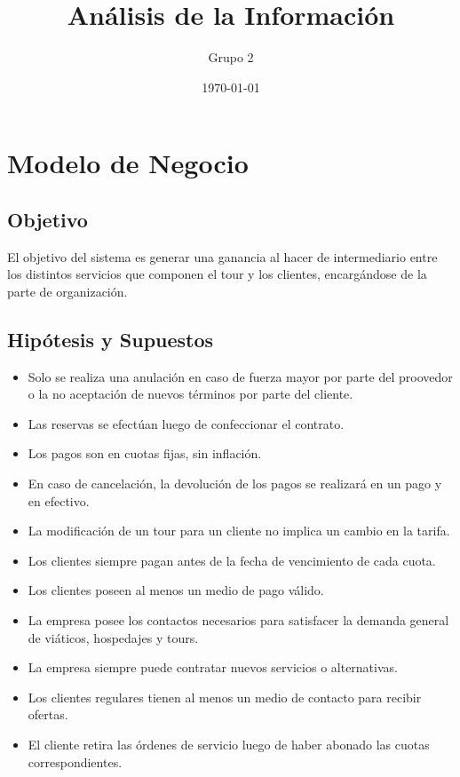 \documentclass[12pt,a4paper]{article}
\title{Análisis de la Información}
\author{
        Grupo 2
}
\date{\today}
\begin{document}
%


\maketitle\thispagestyle{empty}

\newpage\null\thispagestyle{empty}\newpage

\newpage
\tableofcontents

\newpage\null\thispagestyle{empty}\newpage

\section{Modelo de Negocio}
	\subsection{Objetivo}
		\item El objetivo del sistema es generar una ganancia al hacer de intermediario entre los distintos servicios que componen el tour y los clientes, encargándose de la parte de organización.

	\subsection{Hipótesis y Supuestos}
		\begin{itemize}
			\item Solo se realiza una anulación en caso de fuerza mayor por parte del proovedor o la no aceptación de nuevos términos por parte del cliente.
			\item Las reservas se efectúan luego de confeccionar el contrato.
			\item Los pagos son en cuotas fijas, sin inflación.
			\item En caso de cancelación, la devolución de los pagos se realizará en un pago y en efectivo.
			\item La modificación de un tour para un cliente no implica un cambio en la tarifa.
			\item Los clientes siempre pagan antes de la fecha de vencimiento de cada cuota.
			\item Los clientes poseen al menos un medio de pago válido.
			\item La empresa posee los contactos necesarios para satisfacer la demanda general de viáticos, hospedajes y tours.
			\item La empresa siempre puede contratar nuevos servicios o alternativas.
			\item Los clientes regulares tienen al menos un medio de contacto para recibir ofertas.
			\item El cliente retira las órdenes de servicio luego de haber abonado las cuotas correspondientes.
		\end{itemize}
\end{document}
